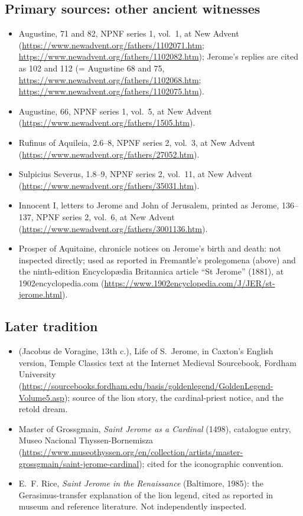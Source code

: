 \subsection*{Primary sources: other ancient witnesses}

\begin{itemize}
\item Augustine,  71 and 82, NPNF series 1, vol.~1, at New
Advent (\url{https://www.newadvent.org/fathers/1102071.htm};
\url{https://www.newadvent.org/fathers/1102082.htm}); Jerome's replies are
cited as  102 and 112 (= Augustine  68 and 75,
\url{https://www.newadvent.org/fathers/1102068.htm};
\url{https://www.newadvent.org/fathers/1102075.htm}).
\item Augustine,  66, NPNF series 1,
vol.~5, at New Advent (\url{https://www.newadvent.org/fathers/1505.htm}).
\item Rufinus of Aquileia,  2.6--8, NPNF
series 2, vol.~3, at New Advent
(\url{https://www.newadvent.org/fathers/27052.htm}).
\item Sulpicius Severus,  1.8--9, NPNF series 2, vol.~11, at
New Advent (\url{https://www.newadvent.org/fathers/35031.htm}).
\item Innocent I, letters to Jerome and John of Jerusalem, printed as
Jerome,  136--137, NPNF series 2, vol.~6, at New Advent
(\url{https://www.newadvent.org/fathers/3001136.htm}).
\item Prosper of Aquitaine, chronicle notices on Jerome's birth and death:
not inspected directly; used as reported in Fremantle's prolegomena (above)
and the ninth-edition Encyclop\ae dia Britannica article ``St Jerome''
(1881), at 1902encyclopedia.com
(\url{https://www.1902encyclopedia.com/J/JER/st-jerome.html}).
\end{itemize}

\subsection*{Later tradition}

\begin{itemize}
\item {} (Jacobus de Voragine, 13th c.), Life of
S.~Jerome, in Caxton's English version, Temple Classics text at the Internet
Medieval Sourcebook, Fordham University
(\url{https://sourcebooks.fordham.edu/basis/goldenlegend/GoldenLegend-Volume5.asp});
source of the lion story, the cardinal-priest notice, and the retold dream.
\item Master of Grossgmain, \textit{Saint Jerome as a Cardinal} (1498),
catalogue entry, Museo Nacional Thyssen-Bornemisza
(\url{https://www.museothyssen.org/en/collection/artists/master-grossgmain/saint-jerome-cardinal});
cited for the iconographic convention.
\item E.~F. Rice, \textit{Saint Jerome in the Renaissance} (Baltimore,
1985): the Gerasimus-transfer explanation of the lion legend, cited as
reported in museum and reference literature. Not independently inspected.
\end{itemize}

